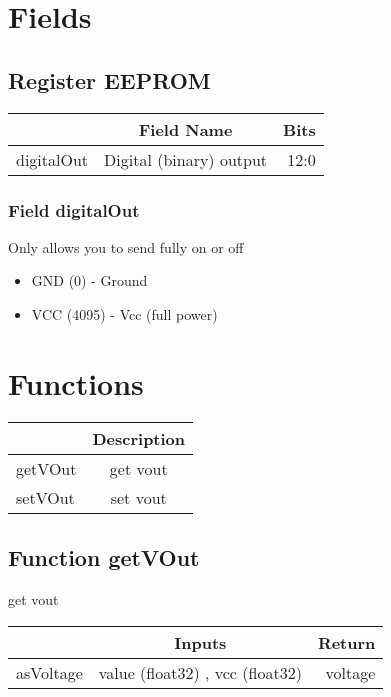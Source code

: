 \documentclass[a4paper,12pt,oneside,pdflatex,italian,final,twocolumn]{article}
\begin{document}
\section{Fields}



\raggedright

\subsection{Register EEPROM}
\centering
\begin{tabular}{lcr}
\toprule
  & Field Name & Bits \\
\midrule
digitalOut & Digital (binary) output &
12:0
\\
\bottomrule

\end{tabular}


\raggedright

\subsubsection{Field digitalOut }

Only allows you to send fully on or off


\begin{itemize}
\item GND (0) - Ground
\item VCC (4095) - Vcc (full power)
\end{itemize}




\raggedright

\section{Functions}

\centering
\begin{tabular}{lc}
\toprule
  & Description \\
\midrule
getVOut & get vout \\
setVOut & set vout \\
\bottomrule
\end{tabular}


\raggedright
\subsection{Function getVOut }
get vout \\

\centering
\begin{tabular}{lcr}
\toprule
  & Inputs & Return \\
\midrule
asVoltage &
value (float32)
, 
vcc (float32)

&
voltage
\\
\bottomrule
\end{tabular}
\end{document}

